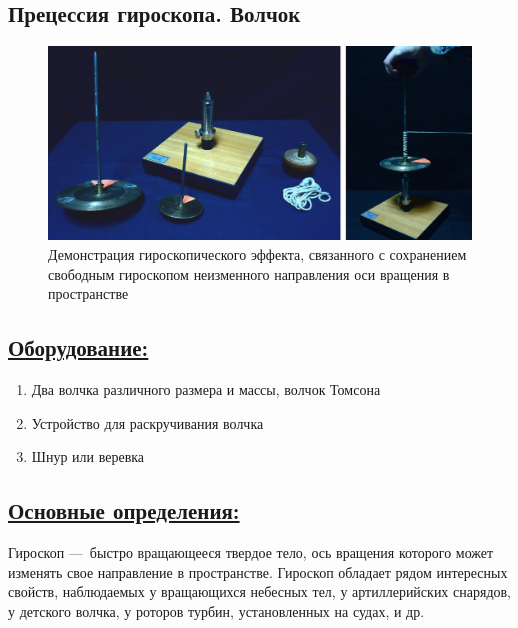 \documentclass[14pt,a4paper,oneside]{extarticle}	%
\begin{document}
	
	
	\begin{center}
		\subsection*{Прецессия гироскопа. Волчок}
	\end{center}
	
	\begin{figure}[H] 	
		\centering 	
		\includegraphics[width=0.9\linewidth]{gyro-4.png}
		\caption{Демонстрация гироскопического эффекта, связанного с сохранением свободным гироскопом неизменного направления оси вращения в пространстве}
		\label{gyro-4}
	\end{figure}
	
	\subsection*{\underline{Оборудование:}}

			\begin{enumerate} 
			\item Два волчка различного размера и массы, волчок Томсона
			\item Устройство для раскручивания волчка
			\item Шнур или веревка
		\end{enumerate}

\newpage
		\subsection*{\underline{Основные определения:}}
	
	Гироскоп — быстро вращающееся твердое тело, ось вращения которого может изменять 
	свое направление в пространстве.
	Гироскоп обладает рядом интересных свойств, наблюдаемых у вращающихся небесных тел, у артиллерийских снарядов, у детского волчка, у роторов турбин, установленных на судах, и др.
	
\end{document}
